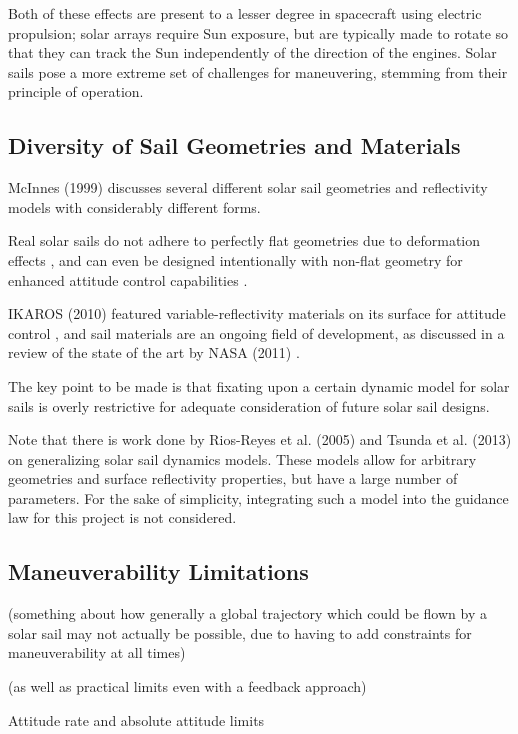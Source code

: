 Both of these effects are present to a lesser degree in spacecraft using electric propulsion; solar arrays require Sun exposure, but are typically made to rotate so that they can track the Sun independently of the direction of the engines. Solar sails pose a more extreme set of challenges for maneuvering, stemming from their principle of operation.

\subsection{Diversity of Sail Geometries and Materials}
McInnes (1999) \cite{mcinnes} discusses several different solar sail geometries and reflectivity models with considerably different forms.

Real solar sails do not adhere to perfectly flat geometries due to deformation effects \cite{sakamoto2006effect}, and can even be designed intentionally with non-flat geometry for enhanced attitude control capabilities \cite{felicetti2016attitude}.

IKAROS (2010) featured variable-reflectivity materials on its surface for attitude control \cite{tsuda2013achievement}, and sail materials are an ongoing field of development, as discussed in a review of the state of the art by NASA (2011) \cite{johnson2011status}.

The key point to be made is that fixating upon a certain dynamic model for solar sails is overly restrictive for adequate consideration of future solar sail designs.

Note that there is work done by Rios-Reyes et al. (2005) \cite{rios2005generalized} and Tsunda et al. (2013) \cite{tsuda2013generalized} on generalizing solar sail dynamics models. These models allow for arbitrary geometries and surface reflectivity properties, but have a large number of parameters. For the sake of simplicity, integrating such a model into the guidance law for this project is not considered. 

\subsection{Maneuverability Limitations}
(something about how generally a global trajectory which could be flown by a solar sail may not actually be possible, due to having to add constraints for maneuverability at all times)

(as well as practical limits even with a feedback approach)

Attitude rate and absolute attitude limits

